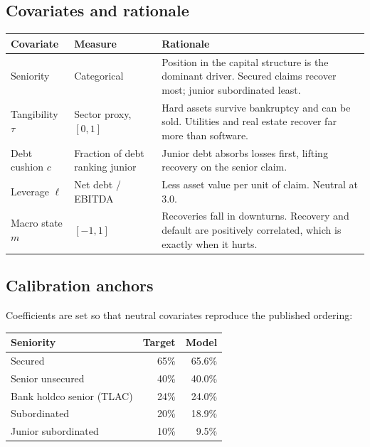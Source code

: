 \documentclass[11pt,a4paper]{article}
\begin{document}
\subsection{Covariates and rationale}

\begin{center}
\begin{tabular}{p{2.6cm}p{3.0cm}p{8.4cm}}
\toprule
\textbf{Covariate} & \textbf{Measure} & \textbf{Rationale} \\
\midrule
Seniority & Categorical & Position in the capital structure is the dominant driver.
Secured claims recover most; junior subordinated least. \\[0.3em]
Tangibility $\tau$ & Sector proxy, $[0,1]$ & Hard assets survive bankruptcy and can be
sold. Utilities and real estate recover far more than software. \\[0.3em]
Debt cushion $c$ & Fraction of debt ranking junior & Junior debt absorbs losses first,
lifting recovery on the senior claim. \\[0.3em]
Leverage $\ell$ & Net debt / EBITDA & Less asset value per unit of claim. Neutral at 3.0. \\[0.3em]
Macro state $m$ & $[-1,1]$ & Recoveries fall in downturns. Recovery and default are
positively correlated, which is exactly when it hurts. \\
\bottomrule
\end{tabular}
\end{center}

\subsection{Calibration anchors}

Coefficients are set so that neutral covariates reproduce the published ordering:

\begin{center}
\begin{tabular}{lrr}
\toprule
\textbf{Seniority} & \textbf{Target} & \textbf{Model} \\
\midrule
Secured & 65\% & 65.6\% \\
Senior unsecured & 40\% & 40.0\% \\
Bank holdco senior (TLAC) & 24\% & 24.0\% \\
Subordinated & 20\% & 18.9\% \\
Junior subordinated & 10\% & 9.5\% \\
\bottomrule
\end{tabular}
\end{center}
\end{document}
